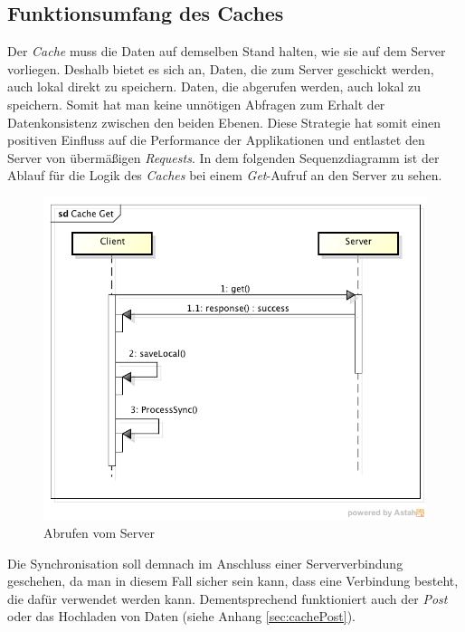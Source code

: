 \subsection{Funktionsumfang des Caches}
\label{ssec:cache-unsere-funktionsweise}
Der \textit{Cache} muss die Daten auf demselben Stand halten, wie sie auf dem Server vorliegen. Deshalb bietet es sich an, Daten, die zum Server geschickt werden, auch lokal direkt zu speichern. Daten, die abgerufen werden, auch lokal zu speichern. Somit hat man keine unnötigen Abfragen zum Erhalt der Datenkonsistenz zwischen den beiden Ebenen. Diese Strategie hat somit einen positiven Einfluss auf die Performance der Applikationen und entlastet den Server von übermäßigen \textit{Requests}. In dem folgenden Sequenzdiagramm ist der Ablauf für die Logik des \textit{Caches} bei einem \textit{Get}-Aufruf an den Server zu sehen.

\begin{figure}[h]
\centering
\includegraphics[width=0.8\linewidth]{content/images/Cache-Get}
\caption{Abrufen vom Server}
\label{pic:cacheGet}
\end{figure}

Die Synchronisation soll demnach im Anschluss einer Serververbindung geschehen, da man in diesem Fall sicher sein kann, dass eine Verbindung besteht, die dafür verwendet werden kann. Dementsprechend funktioniert auch der \textit{Post} oder das Hochladen von Daten (siehe Anhang \ref{sec:cachePost}).